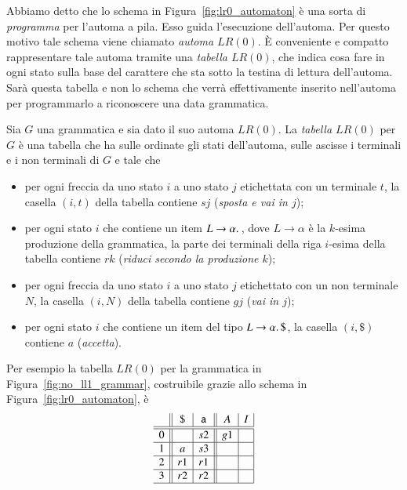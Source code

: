 Abbiamo detto che lo schema in Figura~\ref{fig:lr0_automaton} \`e una
sorta di \emph{programma} per l'automa a pila. Esso guida l'esecuzione
dell'automa. Per questo motivo tale schema viene
chiamato \emph{automa $\mathit{LR}(0)$}.
\`E conveniente e compatto rappresentare
tale automa tramite una \emph{tabella $\mathit{LR}(0)$},
che indica cosa fare in ogni
stato sulla base del carattere che sta sotto la testina di lettura dell'automa.
Sar\`a questa tabella e non lo schema che verr\`a effettivamente inserito
nell'automa per programmarlo a riconoscere una data grammatica.
%
\begin{definition}\label{def:lr0_table}
Sia $G$ una grammatica e sia dato il suo automa $\mathit{LR}(0)$.
La \emph{tabella $\mathit{LR}(0)$}
per $G$ \`e una tabella che ha sulle ordinate gli
stati dell'automa, sulle ascisse i terminali e i non terminali di $G$ e tale
che
\begin{itemize}
\item per ogni freccia da uno stato $i$ a uno stato $j$ etichettata con
      un terminale $t$, la casella $(i,t)$ della tabella contiene $sj$
      (\emph{sposta e vai in $j$});
\item per ogni stato $i$ che contiene un item $L\to\alpha.\,$, dove
      $L\to\alpha$ \`e la $k$-esima produzione della grammatica,
      la parte dei terminali della
      riga $i$-esima della tabella contiene $rk$ (\emph{riduci secondo
      la produzione $k$});
\item per ogni freccia da uno stato $i$ a uno stato $j$ etichettato con
      un non terminale $N$, la casella $(i,N)$ della tabella contiene $gj$
      (\emph{vai in $j$});
\item per ogni stato $i$ che contiene un item del tipo $L\to\alpha.\,
      \mathtt{\$}$, la casella $(i,\mathtt{\$})$ contiene $a$ (\emph{accetta}).
\end{itemize}
\end{definition}
%
\noindent
Per esempio la tabella $\mathit{LR}(0)$ per la grammatica in
Figura~\ref{fig:no_ll1_grammar}, costruibile grazie allo schema in
Figura~\ref{fig:lr0_automaton}, \`e
\begin{equation}\label{eq:lr0_table}
\begin{array}{c||c|c||c|c|}
  & \mathtt{\$} & \mathtt{a} & A & I \\\hline\hline
0 &             & s2         & g1 &  \\\hline
1 & a           & s3         &    &  \\\hline
2 & r1          & r1         &    &  \\\hline
3 & r2          & r2         &    &  \\\hline
\end{array}
\end{equation}
